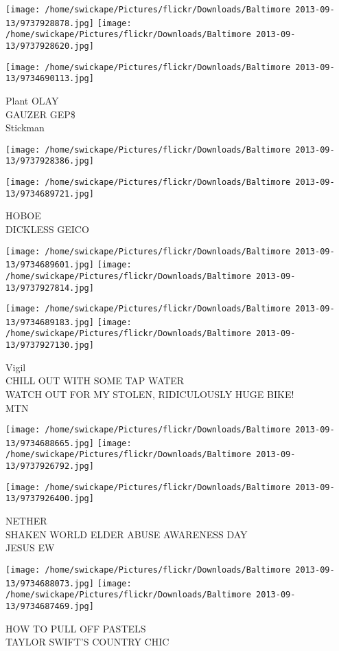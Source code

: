\documentclass[10pt,letterpaper]{article}
\begin{document}
\texttt{[image: /home/swickape/Pictures/flickr/Downloads/Baltimore 2013-09-13/9737928878.jpg]}
\texttt{[image: /home/swickape/Pictures/flickr/Downloads/Baltimore 2013-09-13/9737928620.jpg]}

\texttt{[image: /home/swickape/Pictures/flickr/Downloads/Baltimore 2013-09-13/9734690113.jpg]}

Plant OLAY\\
GAUZER GEP\$\\
Stickman\\
\pagebreak

\texttt{[image: /home/swickape/Pictures/flickr/Downloads/Baltimore 2013-09-13/9737928386.jpg]}

\vspace{0.25in}
\texttt{[image: /home/swickape/Pictures/flickr/Downloads/Baltimore 2013-09-13/9734689721.jpg]}

HOBOE\\
DICKLESS GEICO\\
\pagebreak

\texttt{[image: /home/swickape/Pictures/flickr/Downloads/Baltimore 2013-09-13/9734689601.jpg]}
\texttt{[image: /home/swickape/Pictures/flickr/Downloads/Baltimore 2013-09-13/9737927814.jpg]}

\texttt{[image: /home/swickape/Pictures/flickr/Downloads/Baltimore 2013-09-13/9734689183.jpg]}
\texttt{[image: /home/swickape/Pictures/flickr/Downloads/Baltimore 2013-09-13/9737927130.jpg]}

Vigil\\
CHILL OUT WITH SOME TAP WATER\\
WATCH OUT FOR MY STOLEN, RIDICULOUSLY HUGE BIKE!\\
MTN\\
\pagebreak

\texttt{[image: /home/swickape/Pictures/flickr/Downloads/Baltimore 2013-09-13/9734688665.jpg]}
\texttt{[image: /home/swickape/Pictures/flickr/Downloads/Baltimore 2013-09-13/9737926792.jpg]}

\vspace{0.25in}
\texttt{[image: /home/swickape/Pictures/flickr/Downloads/Baltimore 2013-09-13/9737926400.jpg]}

NETHER\\
SHAKEN WORLD ELDER ABUSE AWARENESS DAY\\
JESUS EW\\
\pagebreak

\texttt{[image: /home/swickape/Pictures/flickr/Downloads/Baltimore 2013-09-13/9734688073.jpg]}
\texttt{[image: /home/swickape/Pictures/flickr/Downloads/Baltimore 2013-09-13/9734687469.jpg]}

HOW TO PULL OFF PASTELS\\
TAYLOR SWIFT'S COUNTRY CHIC\\
\pagebreak
\end{document}
